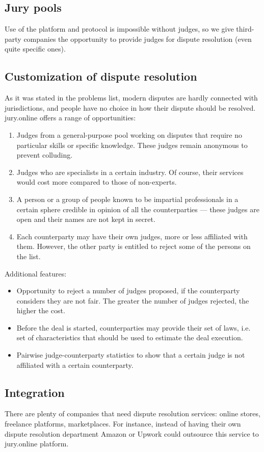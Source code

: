 \documentclass[12pt]{article}
\begin{document}
\subsection{Jury pools}
Use of the platform and protocol is impossible without judges, so we give third-party companies the opportunity to provide judges for dispute resolution (even quite specific ones).

\subsection{Customization of dispute resolution}
As it was stated in the problems list, modern disputes are hardly connected with jurisdictions, and people have no choice in how their
dispute should be resolved. jury.online offers a range of opportunities:
\begin{enumerate}
		\item Judges from a general-purpose pool working on disputes that require no particular skills or specific knowledge. These judges remain anonymous to prevent colluding.
		\item Judges who are specialists in a certain industry. Of course, their services would cost more compared to those of non-experts.
		\item A person or a group of people known to be impartial professionals in a certain sphere credible in opinion of all the counterparties —
				these judges are open and their names are not kept in secret.
		\item Each counterparty may have their own judges, more or less affiliated
				with them. However, the other party is entitled to reject some of the persons on the list.
\end{enumerate}
Additional features:
\begin{itemize}
		\item Opportunity to reject a number of judges proposed, if the counterparty considers they are not fair. The greater the number of judges rejected, the higher the cost.
		\item Before the deal is started, counterparties may provide their set of laws, i.e. set of characteristics that should be used to estimate the deal execution.
		\item Pairwise judge-counterparty statistics to show that a certain judge is not affiliated with a certain counterparty.
\end{itemize}

\subsection{Integration}
There are plenty of companies that need dispute resolution services: online stores, freelance platforms, marketplaces. For instance, instead
of having their own dispute resolution department Amazon or Upwork could outsource this service to jury.online platform.
\end{document}
